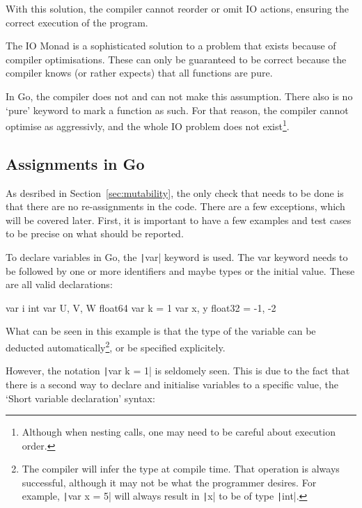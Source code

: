 With this solution, the compiler cannot reorder or omit IO actions, ensuring
the correct execution of the program.

The IO Monad is a sophisticated solution to a problem that exists because of
compiler optimisations. These can only be guaranteed to be correct because
the compiler knows (or rather expects) that all functions are pure.

In Go, the compiler does not and can not make this assumption. There also
is no `pure' keyword to mark a function as such. For that reason, the
compiler cannot optimise as aggressivly, and the whole IO problem does
not exist\footnote{Although when nesting calls, one may need to be careful about
execution order.}.

\subsection{Assignments in Go}

As desribed in Section~\ref{sec:mutability}, the only check that needs
to be done is that there are no re-assignments in the code. There are a few
exceptions, which will be covered later. First, it is important to have
a few examples and test cases to be precise on what should be reported.

To declare variables in Go, the \texttt|var| keyword is used.
The var keyword needs to be followed by one or more identifiers and maybe
types or the initial value. These are all valid declarations:

\begin{code}
	\begin{gocode}
var i int
var U, V, W float64
var k = 1
var x, y float32 = -1, -2
	\end{gocode}
\end{code}
What can be seen in this example is that the type of the variable can be
deducted automatically\footnote{The compiler will infer the type at compile
time. That operation is always successful, although it may not be what
the programmer desires. For example, \texttt|var x = 5| will
always result in \texttt|x| to be of type \texttt|int|.},
or be specified explicitely.

However, the notation \texttt|var k = 1| is seldomely seen. This
is due to the fact that there is a second way to declare and initialise
variables to a specific value, the `Short variable declaration' syntax:

